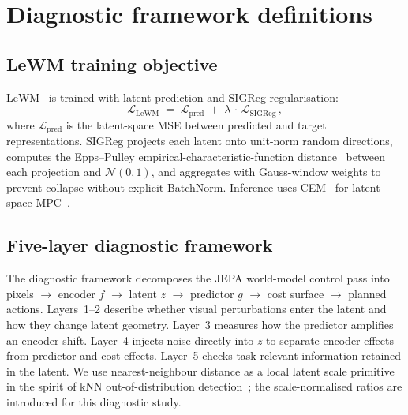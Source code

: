 \documentclass[10pt]{article}
\begin{document}
\section{Diagnostic framework definitions}\label{sec:appendix-diagnostic-framework}

\subsection{LeWM training objective}
LeWM~\cite{maes2026lewm} is trained with latent prediction and SIGReg regularisation:
\begin{equation}
  \mathcal{L}_{\text{LeWM}} \;=\; \mathcal{L}_{\text{pred}} \;+\; \lambda \,\cdot\, \mathcal{L}_{\text{SIGReg}}\,,
  \label{eq:lewm-loss}
\end{equation}
where $\mathcal{L}_{\text{pred}}$ is the latent-space MSE between predicted and target representations. SIGReg projects each latent onto unit-norm random directions, computes the Epps--Pulley empirical-characteristic-function distance~\cite{eppspulley1983} between each projection and $\mathcal{N}(0,1)$, and aggregates with Gauss-window weights to prevent collapse without explicit BatchNorm. Inference uses CEM~\cite{williams2007cem} for latent-space MPC~\cite{garcia1989mpc}.

\subsection{Five-layer diagnostic framework}\label{sec:bg-five-layers}
The diagnostic framework decomposes the JEPA world-model control pass into pixels $\to$ encoder $f$ $\to$ latent $z$ $\to$ predictor $g$ $\to$ cost surface $\to$ planned actions. Layers~1--2 describe whether visual perturbations enter the latent and how they change latent geometry. Layer~3 measures how the predictor amplifies an encoder shift. Layer~4 injects noise directly into $z$ to separate encoder effects from predictor and cost effects. Layer~5 checks task-relevant information retained in the latent. We use nearest-neighbour distance as a local latent scale primitive in the spirit of kNN out-of-distribution detection~\cite{sun2022knnood}; the scale-normalised ratios are introduced for this diagnostic study.
\end{document}
